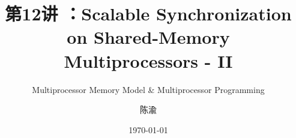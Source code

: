 


\title[第12讲]{第12讲 ：Scalable Synchronization on Shared-Memory Multiprocessors - II} %
\subtitle{Multiprocessor Memory Model \& Multiprocessor Programming}
\author{陈渝} %
\date{\today} %





\begin{frame}
\titlepage %
\end{frame}

